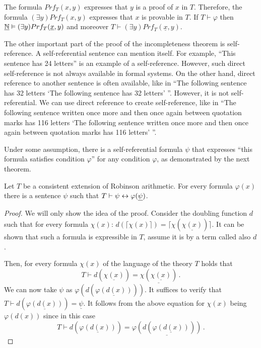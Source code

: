 The formula $Prf_T(x,y)$ expresses that $y$ is a proof of $x$ in $T$. Therefore, the formula $(\exists y)Prf_T(x, y)$ expresses that $x$ is provable in $T$. If $T \vdash \varphi$ then $\underline{\mathbb{N}} \vDash (\exists y)Prf_T(\underline{x}, y)$ and moreover $T \vdash (\exists y)Prf_T(\underline{x}, y)$.

The other important part of the proof of the incompleteness theorem is self-reference. A self-referential sentence can mention itself. For example, ``This sentence has 24 letters'' is an example of a self-reference. However, such direct self-reference is not always available in formal systems. On the other hand, direct reference to another sentence is often available, like in ``The following sentence has 32 letters `The following sentence has 32 letters' ''. However, it is not self-referential. We can use direct reference to create self-reference, like in ``The following sentence written once more and then once again between quotation marks has 116 letters `The following sentence written once more and then once again between quotation marks has 116 letters' ''.

Under some assumption, there is a self-referential formula $\psi$ that expresses ``this formula satisfies condition $\varphi$'' for any condition $\varphi$, as demonstrated by the next theorem.

\begin{theorem}
Let $T$ be a consistent extension of Robinson arithmetic. For every formula $\varphi(x)$ there is a sentence $\psi$ such that $T \vdash \psi \leftrightarrow \varphi(\underline{\psi})$.
\end{theorem}
\begin{proof}
We will only show the idea of the proof. Consider the doubling function $d$ such that for every formula $\chi(x)$: $d(\lceil \chi(x) \rceil) = \lceil \chi(\underline{\chi (x)}) \rceil$. It can be shown that such a formula is expressible in $T$, assume it is by a term called also $d$.

Then, for every formula $\chi(x)$ of the language of the theory $T$ holds that $$T \vdash d(\underline{\chi(x)}) = \underline{\chi(\underline{\chi(x)})}\,.$$ We can now take $\psi$ as $\varphi(d(\underline{\varphi(d(x))}))$. It suffices to verify that $T \vdash d(\underline{\varphi(d(x))}) = \underline{\psi}$. It follows from the above equation for $\chi(x)$ being $\varphi(d(x))$ since in this case $$T \vdash d(\underline{\varphi(d(x))}) = \underline{\varphi(d(\underline{\varphi(d(x))}))}\,.$$
\end{proof}

